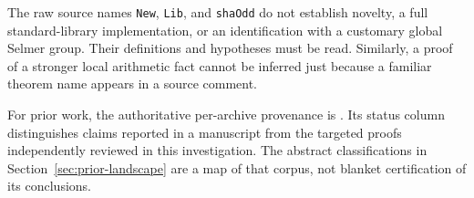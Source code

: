 The raw source names \texttt{New}, \texttt{Lib}, and \texttt{shaOdd}
do not establish novelty, a full standard-library implementation, or an
identification with a customary global Selmer group. Their definitions
and hypotheses must be read. Similarly, a proof of a stronger local
arithmetic fact cannot be inferred just because a familiar theorem
name appears in a source comment.

For prior work, the authoritative per-archive provenance is
. Its status column distinguishes
claims reported in a manuscript from the targeted proofs independently
reviewed in this investigation. The abstract classifications in
Section~\ref{sec:prior-landscape} are a map of that corpus, not blanket
certification of its conclusions.
